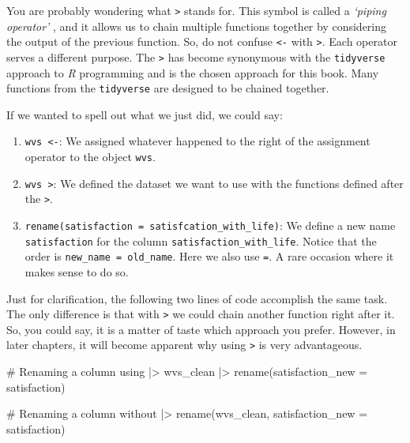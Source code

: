 \documentclass[
  letterpaper,
]{krantz}
\makeatletter
\newenvironment{Shaded}{\begin{snugshade}}{\end{snugshade}}
\newcommand{\AttributeTok}[1]{\textcolor[rgb]{0.40,0.45,0.13}{#1}}
\newcommand{\CommentTok}[1]{\textcolor[rgb]{0.37,0.37,0.37}{#1}}
\newcommand{\FunctionTok}[1]{\textcolor[rgb]{0.28,0.35,0.67}{#1}}
\newcommand{\NormalTok}[1]{\textcolor[rgb]{0.00,0.23,0.31}{#1}}
\newcommand{\SpecialCharTok}[1]{\textcolor[rgb]{0.37,0.37,0.37}{#1}}
\newenvironment{kframe}{%
\medskip{}
\setlength{\fboxsep}{.8em}
 \def\at@end@of@kframe{}%
 \ifinner\ifhmode%
  \def\at@end@of@kframe{\end{minipage}}%
  \begin{minipage}{\columnwidth}%
 \fi\fi%
 \def\FrameCommand##1{\hskip\@totalleftmargin \hskip-\fboxsep
 \colorbox{shadecolor}{##1}\hskip-\fboxsep
     \hskip-\linewidth \hskip-\@totalleftmargin \hskip\columnwidth}%
 \MakeFramed {\advance\hsize-\width
   \@totalleftmargin\z@ \linewidth\hsize
   \@setminipage}}%
 {\par\unskip\endMakeFramed%
 \at@end@of@kframe}
\renewenvironment{Shaded}{\begin{kframe}}{\end{kframe}}
\makeatother
\begin{document}
You are probably wondering what \texttt{\textbar{}\textgreater{}} stands
for. This symbol is called a \emph{`piping operator'} , and it allows us
to chain multiple functions together by considering the output of the
previous function. So, do not confuse \texttt{\textless{}-} with
\texttt{\textbar{}\textgreater{}}. Each operator serves a different
purpose. The \texttt{\textbar{}\textgreater{}} has become synonymous
with the \texttt{tidyverse} approach to \emph{R} programming and is the
chosen approach for this book. Many functions from the
\texttt{tidyverse} are designed to be chained together.

If we wanted to spell out what we just did, we could say:

\begin{enumerate}
\def\labelenumi{\arabic{enumi}.}
\item
  \texttt{wvs\ \textless{}-}: We assigned whatever happened to the right
  of the assignment operator to the object \texttt{wvs}.
\item
  \texttt{wvs\ \textbar{}\textgreater{}}: We defined the dataset we want
  to use with the functions defined after the
  \texttt{\textbar{}\textgreater{}}.
\item
  \texttt{rename(satisfaction\ =\ satisfcation\_with\_life)}: We define
  a new name \texttt{satisfaction} for the column
  \texttt{satisfaction\_with\_life}. Notice that the order is
  \texttt{new\_name\ =\ old\_name}. Here we also use \texttt{=}. A rare
  occasion where it makes sense to do so.
\end{enumerate}

Just for clarification, the following two lines of code accomplish the
same task. The only difference is that with
\texttt{\textbar{}\textgreater{}} we could chain another function right
after it. So, you could say, it is a matter of taste which approach you
prefer. However, in later chapters, it will become apparent why using
\texttt{\textbar{}\textgreater{}} is very advantageous.

\begin{Shaded}
\begin{Highlighting}[]
\CommentTok{\# Renaming a column using \textquotesingle{}|\textgreater{}\textquotesingle{}}
\NormalTok{wvs\_clean }\SpecialCharTok{|\textgreater{}} \FunctionTok{rename}\NormalTok{(}\AttributeTok{satisfaction\_new =}\NormalTok{ satisfaction)}

\CommentTok{\# Renaming a column without \textquotesingle{}|\textgreater{}\textquotesingle{}}
\FunctionTok{rename}\NormalTok{(wvs\_clean, }\AttributeTok{satisfaction\_new =}\NormalTok{ satisfaction)}
\end{Highlighting}
\end{Shaded}
\end{document}
